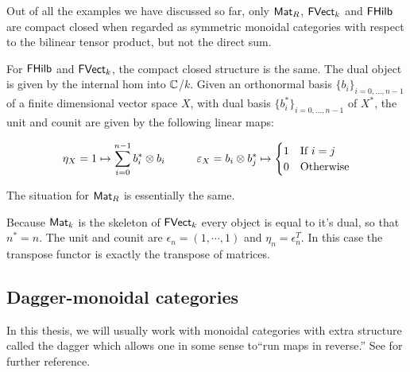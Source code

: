 \begin{example}
Out of all the examples we have discussed so far, only $\Mat_R$, $\FVect_k$ and $\FHilb$ are compact closed when regarded as symmetric monoidal categories with respect to the bilinear tensor product, but not the direct sum.

For $\FHilb$ and $\FVect_k$, the compact closed structure is the same.  The dual object is given by the internal hom into $\C$/$k$.  Given an orthonormal basis $\{ b_i \}_{i=0,\ldots, n-1}$ of a finite dimensional vector space $X$, with dual basis $\{b_i^* \}_{i=0,\ldots, n-1}$ of $X^*$, the unit and counit are given by the following linear maps:

$$
\eta_X = 1 \mapsto \sum_{i=0}^{n-1} b_i^* \otimes b_i \hspace*{1cm}\epsilon_X = b_i\otimes b_j^* \mapsto 
\begin{cases}
1 & \text{If $i=j$}\\
0 & \text {Otherwise}
\end{cases}
$$



The situation for $\Mat_R$ is essentially the same.

Because $\Mat_k$ is the skeleton of $\FVect_k$ every object is equal to it's dual, so that $n^*=n$.
The unit and counit are $\epsilon_n=(1,\cdots, 1)$ and  $\eta_n=\epsilon_n^T$.  In this case the transpose functor is exactly the transpose of matrices. 
\end{example}






\subsection{Dagger-monoidal categories}
In this thesis, we will usually work with monoidal categories with extra structure called the dagger which allows one in some sense to``run maps in reverse.'' See \cite{cpm,coecke} for further reference.


